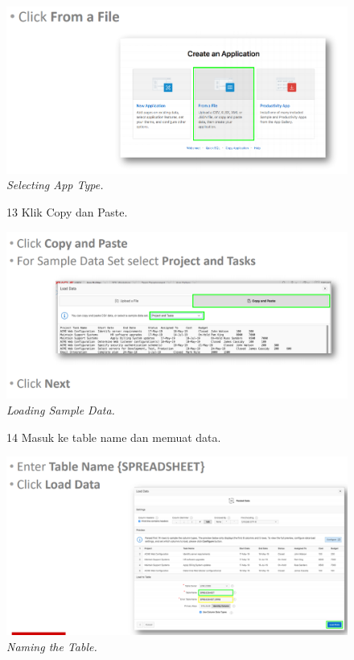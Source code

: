 \begin{enumerate}
\begin{figure}
    \begin{center}
\includegraphics[scale=0.6]{figures/5.PNG}
    \caption{\textit{Selecting App Type.}}
        \end{center}
\label{gambar}
\end{figure}

\begin{figure}
\item[13] Klik Copy dan Paste.

    \begin{center}
\includegraphics[scale=0.6]{figures/6.PNG}
    \caption{\textit{Loading Sample Data.}}
        \end{center}
\label{gambar}
\end{figure}

\begin{figure}
\item[14] Masuk ke table name dan memuat data.

    \begin{center}
\includegraphics[scale=0.4]{figures/7.PNG}
    \caption{\textit{Naming the Table.}}
        \end{center}
\label{gambar}
\end{figure}


\end{enumerate}
